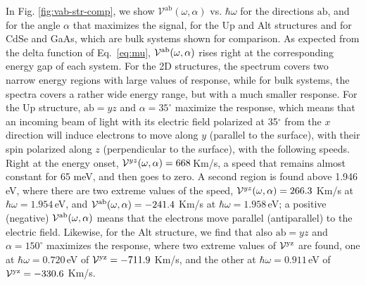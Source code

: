 \documentclass[floatfix,prb,aps,superscriptaddress,showpacs,11pt,preprint,letterpaper]{revtex4}
\begin{document}
In Fig. \ref{fig:vab-str-comp}, we show $\mathcal{V}^{\mathrm{ab}}
(\omega,\alpha)$ vs. $\hbar\omega$ for the directions $\mathrm{a}\mathrm{b}$,
and for the angle $\alpha$ that maximizes the signal, for the Up  and Alt
structures and for CdSe and GaAs, which are bulk systems shown for comparison.
As expected from the delta function of Eq.~\eqref{eq:mu}, ${\cal
V}^{\mathrm{a}\mathrm{b}}(\omega,\alpha)$ rises right at the corresponding
energy gap of each system. For the 2D structures, the spectrum covers two narrow
energy regions with large values of response, while for bulk systems, the
spectra covers a rather wide energy range, but with a much smaller response. For
the Up structure, $\mathrm{a}\mathrm{b}=yz$ and $\alpha=35^\circ$ maximize the
response, which means that an incoming beam of light with its electric field
polarized at 35$^\circ$ from the $x$ direction will induce electrons to move
along $y$ (parallel to the surface), with their spin polarized along $z$
(perpendicular to the surface), with the following speeds. Right at the energy
onset, ${\cal V}^{yz}(\omega,\alpha)=668$\,Km/s, a speed that remains almost
constant for 65 meV, and then goes to zero. A second region is found above 1.946
eV, where there are two extreme values of the speed, ${\cal
V}^{yz}(\omega,\alpha)=266.3$ Km/s at $\hbar\omega=1.954$\,eV, and ${\cal
V}^{\mathrm{a}\mathrm{b}}(\omega,\alpha)=-241.4$ Km/s at
$\hbar\omega=1.958$\,eV; a positive (negative) ${\cal
V}^{\mathrm{a}\mathrm{b}}(\omega,\alpha)$ means that the electrons move parallel
(antiparallel) to the electric field. Likewise, for the Alt structure, we find
that also $\mathrm{a}\mathrm{b}=yz$ and $\alpha=150^\circ$ maximizes the
response, where two extreme values of ${\cal V}^{\mathrm{y}\mathrm{z}}$ are
found, one at  $\hbar\omega=0.720$\,eV of ${\cal
V}^{\mathrm{y}\mathrm{z}}=-711.9$ Km/s, and the other at $\hbar\omega=0.911$\,eV
of ${\cal V}^{\mathrm{y}\mathrm{z}}=-330.6$ Km/s.
 
\end{document}
